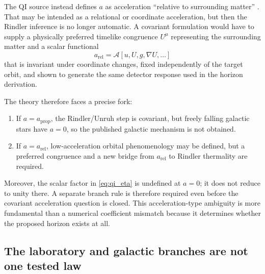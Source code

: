 \documentclass[11pt]{article}
\begin{document}
The QI source instead defines \(a\) as acceleration ``relative to surrounding matter'' \cite{McCulloch2016}. That may be intended as a relational or coordinate acceleration, but then the Rindler inference is no longer automatic. A covariant formulation would have to supply a physically preferred timelike congruence \(U^{\mu}\) representing the surrounding matter and a scalar functional
\begin{equation}
    a_{\mathrm{rel}}
    =\mathcal A[u,U,g,\nabla U,\ldots]
    \label{eq:relational_acceleration_placeholder}
\end{equation}
that is invariant under coordinate changes, fixed independently of the target orbit, and shown to generate the same detector response used in the horizon derivation.

The theory therefore faces a precise fork:
\begin{enumerate}[leftmargin=1.55em]
    \item If \(a=a_{\mathrm{prop}}\), the Rindler/Unruh step is covariant, but freely falling galactic stars have \(a=0\), so the published galactic mechanism is not obtained.
    \item If \(a=a_{\mathrm{rel}}\), low-acceleration orbital phenomenology may be defined, but a preferred congruence and a new bridge from \(a_{\mathrm{rel}}\) to Rindler thermality are required.
\end{enumerate}
Moreover, the scalar factor in \cref{eq:qi_eta} is undefined at \(a=0\); it does not reduce to unity there. A separate branch rule is therefore required even before the covariant acceleration question is closed. This acceleration-type ambiguity is more fundamental than a numerical coefficient mismatch because it determines whether the proposed horizon exists at all.


\subsection{The laboratory and galactic branches are not one tested law}
\label{sec:branch_nontransfer}
\end{document}
